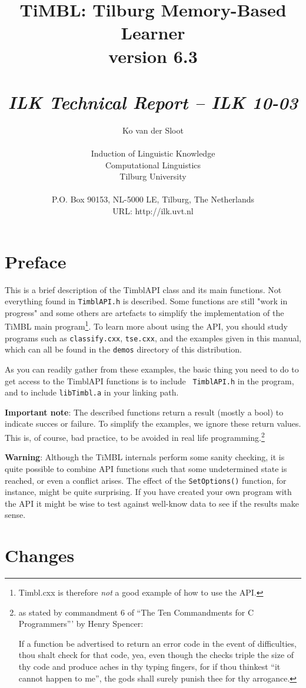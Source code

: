 \documentclass{report}
\author{Ko van der Sloot\\ \ \\ Induction of Linguistic Knowledge\\
        Computational Linguistics\\ Tilburg University \\ \ \\
        P.O. Box 90153, NL-5000 LE, Tilburg, The Netherlands \\ URL:
        http://ilk.uvt.nl}
\title{{\huge TiMBL: Tilburg Memory-Based Learner} \\ \vspace*{0.5cm}
{\bf version 6.3} \\ \vspace*{0.5cm}{\huge API Reference Guide}\\
\vspace*{1cm} {\it ILK Technical Report -- ILK 10-03}}
\begin{document}
\maketitle

\tableofcontents

\chapter*{Preface}

This is a brief description of the TimblAPI class and its main
functions.  Not everything found in {\tt TimblAPI.h} is
described. Some functions are still "work in progress" and some others
are artefacts to simplify the implementation of the TiMBL main
program\footnote{Timbl.cxx is therefore {\em not} a good example of
  how to use the API.}.  To learn more about using the API, you should
study programs such as {\tt classify.cxx}, {\tt tse.cxx}, and the
examples given in this manual, which can all be found in the {\tt demos}
directory of this distribution.

As you can readily gather from these examples, the basic thing you
need to do to get access to the TimblAPI functions is to include {\tt
  TimblAPI.h} in the program, and to include {\tt libTimbl.a} in your
linking path.

{\bf Important note}: The described functions return a result (mostly
a bool) to indicate succes or failure. To simplify the examples, we
ignore these return values. This is, of course, bad practice, to be avoided in
real life programming.\footnote{as stated by commandment 6 of ``The
  Ten Commandments for C Programmers''' by Henry Spencer:	

If a function be advertised to return an error code in the event of
difficulties, thou shalt check for that code, yea, even though the
checks triple the size of thy code and produce aches in thy typing
fingers, for if thou thinkest ``it cannot happen to me'', the gods
shall surely punish thee for thy arrogance.}

{\bf Warning}: Although the TiMBL internals perform some sanity
checking, it is quite possible to combine API functions such
that some undetermined state is reached, or even a conflict
arises. The effect of the {\tt SetOptions()} function, for instance,
might be quite surprising. If you have created your own program
with the API it might be wise to test against well-know data to see if
the results make sense.

\chapter{Changes}
\label{changes}
\end{document}
